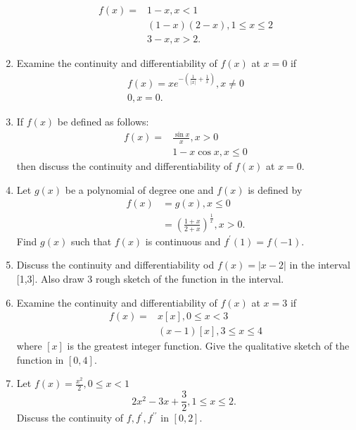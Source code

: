 \begin{enumerate}[start=1]
    \[
    \begin{aligned}
    f(x)= & 1-x, x<1 \\
    & (1-x)(2-x), 1 \leq x \leq 2 \\
    & 3-x, x>2 .
    \end{aligned}
    \]
    \item Examine the continuity and differentiability of $f(x)$ at $x=0$ if
    \[
    \begin{gathered}
    f(x)=x e^{-\left(\frac{1}{|x|}+\frac{1}{x}\right)}, x \neq 0 \\
    0, x=0 .
    \end{gathered}
    \]
    \item If $f(x)$ be defined as follows:
    \[
    \begin{aligned}
    f(x)= & \frac{\sin x}{x}, x>0 \\
    & 1-x \cos x, x \leq 0
    \end{aligned}
    \]
    then discuss the continuity and differentiability of $f(x)$ at $x=0$.
    \item Let $g(x)$ be a polynomial of degree one and $f(x)$ is defined by
    \[
    \begin{aligned}
    f(x) & =g(x), x \leq 0 \\
    & =\left(\frac{1+x}{2+x}\right)^{\frac{1}{x}}, x>0 .
    \end{aligned}
    \]
    Find $g(x)$ such that $f(x)$ is continuous and $f^{\prime}(1)=f(-1)$.
    \item Discuss the continuity and differentiability od $f(x)=|x-2|$ in the interval [1,3]. Also draw 3 rough sketch of the function in the interval.
    \item Examine the continuity and differentiability of $f(x)$ at $x=3$ if
    \[
    \begin{aligned}
    f(x)= & x[x], 0 \leq x<3 \\
    & (x-1)[x], 3 \leq x \leq 4
    \end{aligned}
    \]
    where $[x]$ is the greatest integer function. Give the qualitative sketch of the function in $[0,4]$.
    \item Let $f(x)=\frac{x^2}{2}, 0 \leq x<1$
    \[
    2 x^2-3 x+\frac{3}{2}, 1 \leq x \leq 2 \text {. }
    \]
    Discuss the continuity of $f, f^{\prime}, f^{\prime \prime}$ in $[0,2]$.
\end{enumerate}
